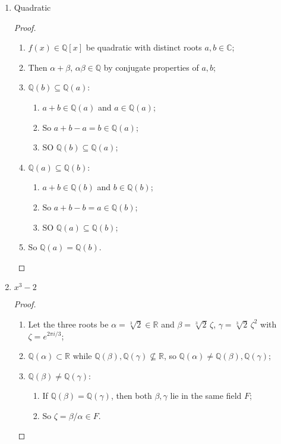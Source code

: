 \documentclass[12pt]{article}
\newcommand{\Q}{\mathbb{Q}}
\newcommand{\C}{\mathbb{C}}
\begin{document}
\begin{enumerate}
    \item Quadratic
        \begin{proof}
        ~
        \begin{enumerate}

            \item $f(x)\in\Q[x]$ be quadratic with distinct roots $a,b\in\C$;
        \item Then $\alpha+\beta,\,\alpha\beta\in\Q$ by conjugate properties of $a,b$;
        \item $\Q(b)\subseteq \Q(a)$:
        \begin{enumerate}
            \item $a+b\in\Q(a)$ and $a\in\Q(a)$;
            \item So $a+b-a=b\in\Q(a)$;
            \item SO $\Q(b)\subseteq \Q(a)$;
        \end{enumerate}
        \item $\Q(a)\subseteq \Q(b)$:
        \begin{enumerate}
            \item $a+b\in\Q(b)$ and $b\in\Q(b)$;
            \item So $a+b-b=a\in\Q(b)$;
            \item SO $\Q(a)\subseteq \Q(b)$;
        \end{enumerate}
        \item So $\Q(a)=\Q(b)$.
        \end{enumerate}
        \end{proof}
    \item $x^3-2$
    \begin{proof}
        ~
        \begin{enumerate}
            \item Let the three roots be $\alpha=\sqrt[3]{2}\in\mathbb{R}$ and $\beta=\sqrt[3]{2}\,\zeta$, $\gamma=\sqrt[3]{2}\,\zeta^2$ with $\zeta=e^{2\pi i/3}$;
            \item $\Q(\alpha)\subset\mathbb{R}$ while $\Q(\beta), \Q(\gamma) \nsubseteq\mathbb{R}$, so $\Q(\alpha)\neq\Q(\beta),\Q(\gamma)$;
            \item $\Q(\beta)\ne\Q(\gamma)$:
            \begin{enumerate}
                \item If $\Q(\beta)=\Q(\gamma)$, then both $\beta,\gamma$ lie in the same field $F$;
                \item So $\zeta=\beta/\alpha\in F$. 

\end{enumerate}
\end{enumerate}
\end{proof}
\end{enumerate}
\end{document}
